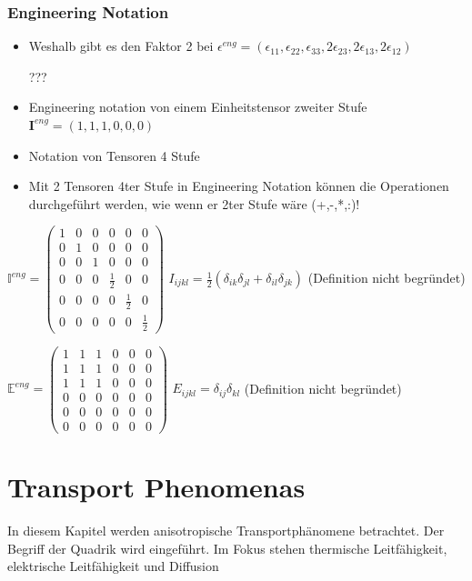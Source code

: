 \documentclass[a4paper]{scrartcl}
\begin{document}
\subsubsection{Engineering Notation}
\begin{itemize}
\item Weshalb gibt es den Faktor 2 bei $ \epsilon^{eng}=(\epsilon_{11},\epsilon_{22},\epsilon_{33},2\epsilon_{23},2\epsilon_{13},2\epsilon_{12}) $

???


\item Engineering notation von einem Einheitstensor zweiter Stufe
$ \textbf{I}^{eng}=(1,1,1,0,0,0) $


\item Notation von Tensoren 4 Stufe
\item Mit 2 Tensoren 4ter Stufe in Engineering Notation können die Operationen
durchgeführt werden, wie wenn er 2ter Stufe wäre (+,-,*,:)!

\end{itemize}
$ \mathbb{I}^{eng}=
\begin{pmatrix}
1 & 0 & 0 & 0 & 0 & 0 \\ 
0 & 1 & 0 & 0 & 0 & 0 \\ 
0 & 0 & 1 & 0 & 0 & 0 \\ 
0 & 0 & 0 & \frac{1}{2} & 0 & 0 \\ 
0 & 0 & 0 & 0 & \frac{1}{2} & 0 \\ 
0 & 0 & 0 & 0 & 0 & \frac{1}{2}
\end{pmatrix} 
$ $I_{ijkl} = \frac{1}{2} (\delta_{ik} \delta_{jl} + \delta_{il} \delta_{jk}) $
(Definition nicht begründet)

$
\mathbb{E}^{eng}=
\begin{pmatrix}
1 & 1 & 1 & 0 & 0 & 0 \\ 
1 & 1 & 1 & 0 & 0 & 0 \\ 
1 & 1 & 1 & 0 & 0 & 0 \\ 
0 & 0 & 0 & 0 & 0 & 0 \\ 
0 & 0 & 0 & 0 & 0 & 0 \\ 
0 & 0 & 0 & 0 & 0 & 0
\end{pmatrix} 
$ $E_{ijkl} = \delta_{ij} \delta_{kl}$ (Definition nicht
begründet)

\section{Transport Phenomenas}
In diesem Kapitel werden anisotropische Transportphänomene betrachtet. Der
Begriff der Quadrik wird eingeführt. Im Fokus stehen thermische Leitfähigkeit,
elektrische Leitfähigkeit und Diffusion
\end{document}
